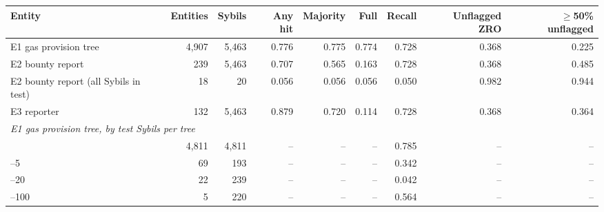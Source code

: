 \begin{tabular}{lrrrrrrrr}
\toprule
Entity & Entities & Sybils & Any hit & Majority & Full & Recall & Unflagged ZRO & $\geq$50\% unflagged \\
\midrule
E1 gas provision tree & 4,907 & 5,463 & 0.776 & 0.775 & 0.774 & 0.728 & 0.368 & 0.225 \\
E2 bounty report & 239 & 5,463 & 0.707 & 0.565 & 0.163 & 0.728 & 0.368 & 0.485 \\
E2 bounty report (all Sybils in test) & 18 & 20 & 0.056 & 0.056 & 0.056 & 0.050 & 0.982 & 0.944 \\
E3 reporter & 132 & 5,463 & 0.879 & 0.720 & 0.114 & 0.728 & 0.368 & 0.364 \\
\midrule
\multicolumn{9}{l}{\emph{E1 gas provision tree, by test Sybils per tree}} \\
\quad 1 & 4,811 & 4,811 & -- & -- & -- & 0.785 & -- & -- \\
\quad 2--5 & 69 & 193 & -- & -- & -- & 0.342 & -- & -- \\
\quad 6--20 & 22 & 239 & -- & -- & -- & 0.042 & -- & -- \\
\quad 21--100 & 5 & 220 & -- & -- & -- & 0.564 & -- & -- \\
\bottomrule
\end{tabular}
